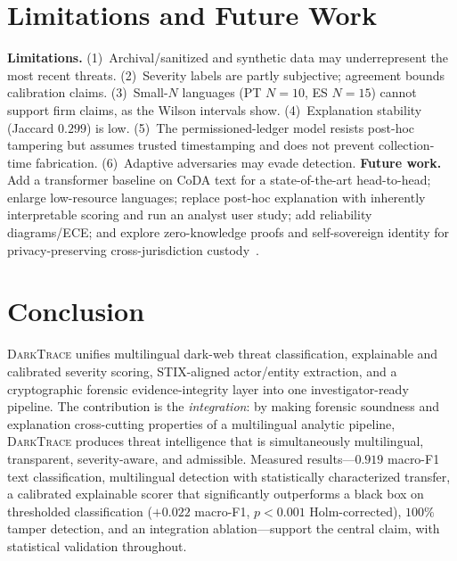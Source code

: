 \documentclass[11pt,a4paper]{article}
\newcommand{\framework}{\textsc{DarkTrace}}
\begin{document}
\section{Limitations and Future Work}\label{sec:limits}
\textbf{Limitations.} (1)~Archival/sanitized and synthetic data may underrepresent the
most recent threats. (2)~Severity labels are partly subjective; agreement bounds
calibration claims. (3)~Small-$N$ languages (PT $N{=}10$, ES $N{=}15$) cannot support firm
claims, as the Wilson intervals show. (4)~Explanation stability (Jaccard $0.299$) is low.
(5)~The permissioned-ledger model resists post-hoc tampering but assumes trusted
timestamping and does not prevent collection-time fabrication. (6)~Adaptive adversaries may
evade detection. \textbf{Future work.} Add a transformer baseline on CoDA text for a
state-of-the-art head-to-head; enlarge low-resource languages; replace post-hoc explanation
with inherently interpretable scoring and run an analyst user study; add reliability
diagrams/ECE; and explore zero-knowledge proofs and self-sovereign identity for
privacy-preserving cross-jurisdiction custody~\cite{loffi2025management}.

\section{Conclusion}\label{sec:conclusion}
\framework{} unifies multilingual dark-web threat classification, explainable and
calibrated severity scoring, STIX-aligned actor/entity extraction, and a cryptographic
forensic evidence-integrity layer into one investigator-ready pipeline. The contribution is
the \emph{integration}: by making forensic soundness and explanation cross-cutting
properties of a multilingual analytic pipeline, \framework{} produces threat intelligence
that is simultaneously multilingual, transparent, severity-aware, and admissible. Measured
results---$0.919$ macro-F1 text classification, multilingual detection with statistically
characterized transfer, a calibrated explainable scorer that significantly outperforms a
black box on thresholded classification ($+0.022$ macro-F1, $p<0.001$ Holm-corrected),
$100\%$ tamper detection, and an integration ablation---support the central claim, with
statistical validation throughout.



\end{document}
